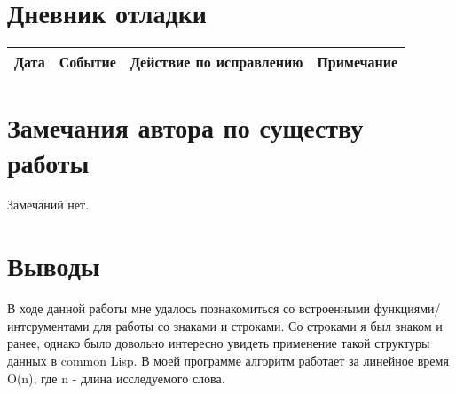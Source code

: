 \documentclass[12pt]{article}
\begin{document}
\section{Дневник отладки}
\begin{tabular}{|p{50pt}|p{130pt}|p{130pt}|p{70pt}|}
\hline
Дата & Событие & Действие по исправлению & Примечание \\ \hline
\end{tabular}

\section{Замечания автора по существу работы}
Замечаний нет.

\section{Выводы}
В ходе данной работы мне удалось познакомиться со встроенными функциями/интсрументами для работы со знаками и строками. Со строками я был знаком и ранее, однако было довольно интересно увидеть применение такой структуры данных в common Lisp. В моей программе алгоритм работает за линейное время O(n), где n - длина исследуемого слова.
\end{document}

